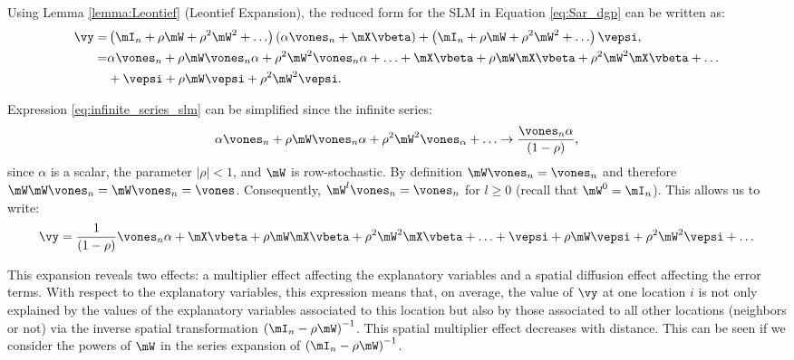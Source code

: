 \documentclass[english,12pt]{book}\usepackage[]{graphicx}\usepackage[]{xcolor}
\begin{document}
Using Lemma \ref{lemma:Leontief} (Leontief Expansion), the reduced form for the SLM in Equation \eqref{eq:Sar_dgp} can be written as:
\begin{equation}\label{eq:infinite_series_slm}
  \begin{aligned}
      \vy  = &\left(\mI_n + \rho\mW + \rho^2\mW^2 + \ldots \right)\left(\alpha \vones_n + \mX\vbeta\right) + \left(\mI_n + \rho\mW + \rho^2\mW^2 + \ldots\right)\vepsi, \\
           = & \alpha\vones_n + \rho\mW\vones_n\alpha + \rho^2\mW^2\vones_n\alpha + \ldots + \mX\vbeta + \rho\mW\mX\vbeta + \rho^2\mW^2\mX\vbeta + \ldots \\
          & + \vepsi + \rho\mW\vepsi + \rho^2\mW^2\vepsi.
  \end{aligned}
\end{equation}

Expression \eqref{eq:infinite_series_slm} can be simplified since the infinite series:
\begin{equation*}
\alpha\vones_n + \rho\mW\vones_n\alpha + \rho^2\mW^2\vones_\alpha + \ldots \to \frac{\vones_n\alpha}{\left(1 - \rho\right)},
\end{equation*}
%
since $\alpha$ is a scalar, the parameter $\left|\rho\right|  < 1$, and $\mW$ is row-stochastic. By definition $\mW\vones_n = \vones_n$ and therefore $\mW\mW\vones_n = \mW\vones_n = \vones$. Consequently, $\mW^l\vones_n = \vones_n$ for $l\geq 0$ (recall that $\mW^0 = \mI_n$). This allows us to write:
\begin{equation*}
\vy = \frac{1}{(1-\rho)}\vones_n\alpha + \mX\vbeta + \rho\mW\mX\vbeta + \rho^2\mW^2\mX\vbeta + \ldots + \vepsi + \rho\mW\vepsi + \rho^2\mW^2\vepsi + \ldots
\end{equation*}

This expansion reveals two effects: a multiplier effect affecting the explanatory variables and a spatial diffusion effect affecting the error terms. With respect to the explanatory variables, this expression means that, on average, the value of $\vy$ at one location $i$ is not only explained by the values of the explanatory variables associated to this location but also by those associated to all other locations (neighbors or not) via the inverse spatial transformation $\left(\mI_n - \rho \mW\right)^{-1}$. This spatial multiplier effect decreases with distance. This can be seen if we consider the powers of $\mW$ in the series expansion of $\left(\mI_n - \rho \mW\right)^{-1}$. 
\end{document}
